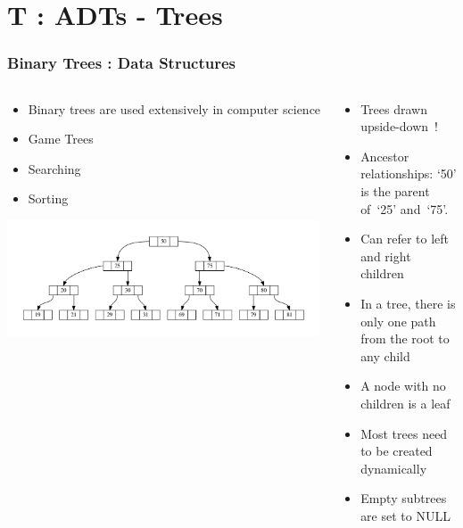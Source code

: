 \section{T : ADTs - Trees}
\label{chap:adts_trees}


\begin{frame}[fragile]
\frametitle{Binary Trees : Data Structures}
\begin{columns}[T]

\begin{column}{0.45\textwidth}
\begin{itemize}[<+->]
\item Binary trees are used extensively in computer science	
\item Game Trees	
\item Searching	
\item Sorting	
\end{itemize}	
\pause
\begin{center}
\includegraphics[width=\textwidth]{../Images/Linkedb.pdf}	
\end{center}
\end{column}

\pause
\begin{column}{0.45\textwidth}
\begin{itemize}[<+->]
\item Trees drawn upside-down~!
\item Ancestor relationships: `50' is the parent of~`25' and~`75'.
\item Can refer to left and right children
\item In a tree, there is only one path from the root to any child
\item A node with no children is a leaf
\item Most trees need to be created dynamically
\item Empty subtrees are set to NULL
\end{itemize}
\end{column}

\end{columns}
\end{frame}

